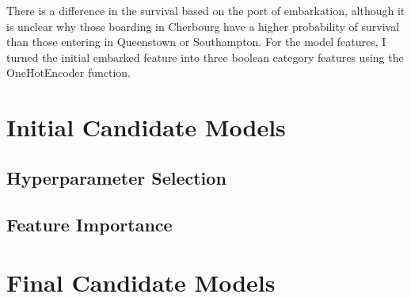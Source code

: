 \documentclass[12pt, letterpaper]{article}
\begin{document}
There is a difference in the survival based on the port of embarkation, although it is unclear why those boarding in Cherbourg have a higher probability of survival than those entering in Queenstown or Southampton. For the model features, I turned the initial embarked feature into three boolean category features using the OneHotEncoder function.

\section{Initial Candidate Models}

\subsection{Hyperparameter Selection}

\subsection{Feature Importance}


\section{Final Candidate Models}
\end{document}
